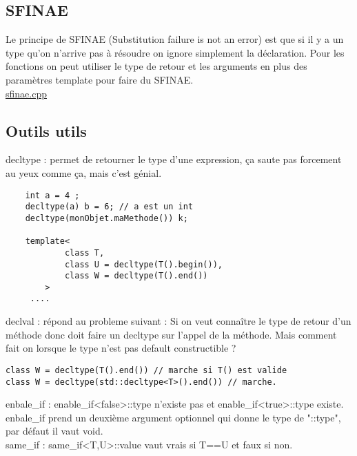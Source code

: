\documentclass{beamer}
\begin{document}
\subsection{SFINAE}
\begin{frame}[containsverbatim]
	Le principe de SFINAE (Substitution failure is not an error) est que si il y a un type qu'on n'arrive pas à résoudre on ignore simplement la déclaration. Pour les fonctions on peut utiliser le type de retour et les arguments en plus des paramètres template pour faire du SFINAE. \\
	\href{run:../code_demo/sfinae.cpp}{sfinae.cpp}\\
\end{frame}

\subsection{Outils utils}

\begin{frame}[containsverbatim]
decltype : permet de retourner le type d'une expression, ça saute pas forcement au yeux comme ça, mais c'est génial.
\begin{lstlisting}
	int a = 4 ;
	decltype(a) b = 6; // a est un int
	decltype(monObjet.maMethode()) k; 

	template<
            class T,
            class U = decltype(T().begin()),
            class W = decltype(T().end())
        >
     .... 
\end{lstlisting}
\end{frame}

\begin{frame}[containsverbatim]
declval : répond au probleme suivant : Si on veut connaître le type de retour d'un méthode donc doit faire un decltype sur l'appel de la méthode. Mais comment fait on lorsque le type n'est pas default constructible ? 
	\begin{verbatim}
class W = decltype(T().end()) // marche si T() est valide
class W = decltype(std::decltype<T>().end()) // marche.
	\end{verbatim}

enbale\_if : enable\_if<false>::type n'existe pas et enable\_if<true>::type existe. enbale\_if prend un deuxième argument optionnel qui donne le type de "::type", par défaut il vaut void.
\\ 
same\_if : same\_if<T,U>::value vaut vrais si T==U et faux si non.
\end{frame}
\end{document}
